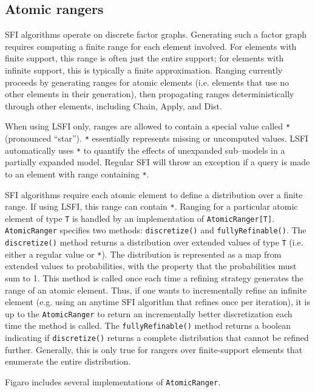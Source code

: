 \subsection{Atomic rangers}

SFI algorithms operate on discrete factor graphs. Generating such a factor graph requires computing a finite range for each element involved. For elements with finite support, this range is often just the entire support; for elements with infinite support, this is typically a finite approximation. Ranging currently proceeds by generating ranges for atomic elements (i.e. elements that use no other elements in their generation), then propagating ranges deterministically through other elements, including Chain, Apply, and Dist.

When using LSFI only, ranges are allowed to contain a special value called \texttt{*} (pronounced ``star''). \texttt{*} essentially represents missing or uncomputed values. LSFI automatically uses \texttt{*} to quantify the effects of unexpanded sub--models in a partially expanded model. Regular SFI will throw an exception if a query is made to an element with range containing \texttt{*}.

SFI algorithms require each atomic element to define a distribution over a finite range. If using LSFI, this range can contain \texttt{*}. Ranging for a particular atomic element of type \texttt{T} is handled by an implementation of \texttt{AtomicRanger[T]}. \texttt{AtomicRanger} specifies two methods: \texttt{discretize()} and \texttt{fullyRefinable()}. The \texttt{discretize()} method returns a distribution over extended values of type \texttt{T} (i.e. either a regular value or \texttt{*}). The distribution is represented as a map from extended values to probabilities, with the property that the probabilities must sum to 1. This method is called once each time a refining strategy generates the range of an atomic element. Thus, if one wants to incrementally refine an infinite element (e.g. using an anytime SFI algorithm that refines once per iteration), it is up to the \texttt{AtomicRanger} to return an incrementally better discretization each time the method is called. The \texttt{fullyRefinable()} method returns a boolean indicating if \texttt{discretize()} returns a complete distribution that cannot be refined further. Generally, this is only true for rangers over finite-support elements that enumerate the entire distribution.

Figaro includes several implementations of \texttt{AtomicRanger}.

